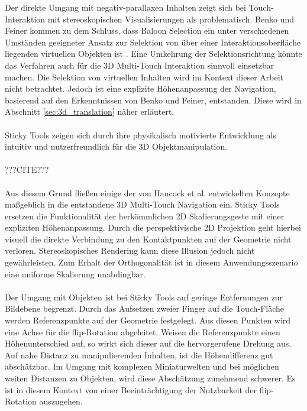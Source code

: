 Der direkte Umgang mit negativ-parallaxen Inhalten zeigt sich bei Touch-Interaktion mit stereoskopischen Visualisierungen als problematisch. Benko und Feiner kommen zu dem Schluss, dass Baloon Selection ein unter verschiedenen Umständen geeigneter Ansatz zur Selektion von über einer Interaktionsoberfläche liegenden virtuellen Objekten ist \cite{benko:2007}. Eine Umkehrung der Selektionsrichtung könnte das Verfahren auch für die 3D Multi-Touch Interaktion sinnvoll einsetzbar machen. Die Selektion von virtuellen Inhalten wird im Kontext dieser Arbeit nicht betrachtet. Jedoch ist eine explizite Höhenanpassung der Navigation, basierend auf den Erkenntnissen von Benko und Feiner, entstanden. Diese wird in Abschnitt \ref{sec:3d_translation} näher erläutert.
\\\\
Sticky Tools zeigen sich durch ihre physikalisch motivierte Entwicklung als intuitiv und nutzerfreundlich für die 3D Objektmanipulation.
\\\\
???CITE???
\\\\
Aus diesem Grund fließen einige der von Hancock et al. entwickelten Konzepte maßgeblich in die entstandene 3D Multi-Touch Navigation ein. Sticky Tools ersetzen die Funktionalität der herkömmlichen 2D Skalierungsgeste mit einer expliziten Höhenanpassung. Durch die perspektivische 2D Projektion geht hierbei visuell die direkte Verbindung zu den Kontaktpunkten auf der Geometrie nicht verloren. Stereoskopisches Rendering kann diese Illusion jedoch nicht gewährleisten. Zum Erhalt der Orthogonalität ist in diesem Anwendungsszenario eine uniforme Skalierung unabdingbar. 
\\\\
Der Umgang mit Objekten ist bei Sticky Tools auf geringe Entfernungen zur Bildebene begrenzt. Durch das Aufsetzen zweier Finger auf die Touch-Fläche werden Referenzpunkte auf der Geometrie festgelegt. Aus diesen Punkten wird eine Achse für die flip-Rotation abgeleitet. Weisen die Referenzpunkte einen Höhenunterschied auf, so wirkt sich dieser auf die hervorgerufene Drehung aus. Auf nahe Distanz zu manipulierenden Inhalten, ist die Höhendifferenz gut abschätzbar. Im Umgang mit komplexen Miniaturwelten und bei möglichen weiten Distanzen zu Objekten, wird diese Abschätzung zunehmend schwerer. Es ist in diesem Kontext von einer Beeinträchtigung der Nutzbarkeit der flip-Rotation auszugehen.
\\\\
